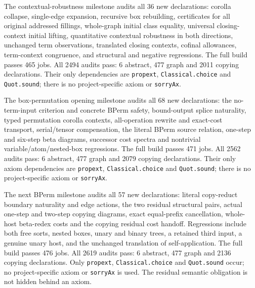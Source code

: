 The contextual-robustness milestone audits all 36 new declarations: corolla
collapse, single-edge expansion, recursive box rebuilding, certificates for
all original addressed fillings, whole-graph initial class equality, universal
closing-context initial lifting, quantitative contextual robustness in both
directions, unchanged term observations, translated closing contexts, cofinal
allowances, term-context congruence, and structural and negative regressions.
The full build passes 465 jobs. All 2494 audits pass: 6 abstract, 477 graph
and 2011 copying declarations. Their only dependencies are \texttt{propext},
\texttt{Classical.choice} and \texttt{Quot.sound}; there is no project-specific
axiom or \texttt{sorryAx}.


The box-permutation opening milestone audits all 68 new declarations: the
no-term-input criterion and concrete BPerm safety, bound-output splice
naturality, typed permutation corolla contexts, all-operation rewrite and
exact-cost transport, serial/tensor compensation, the literal BPerm source
relation, one-step and six-step beta diagrams, successor cost spectra and
nontrivial variable/atom/nested-box regressions. The full build passes 471
jobs. All 2562 audits pass: 6 abstract, 477 graph and 2079 copying declarations.
Their only axiom dependencies are \texttt{propext}, \texttt{Classical.choice}
and \texttt{Quot.sound}; there is no project-specific axiom or \texttt{sorryAx}.


The next BPerm milestone audits all 57 new declarations: literal copy-reduct
boundary naturality and edge actions, the two residual structural pairs,
actual one-step and two-step copying diagrams, exact equal-prefix cancellation,
whole-host beta-redex costs and the copying residual cost handoff. Regressions
include both free sorts, nested boxes, unary and binary trees, a retained third
input, a genuine unary host, and the unchanged translation of self-application.
The full build passes 476 jobs. All 2619 audits pass: 6 abstract, 477 graph and
2136 copying declarations. Only \texttt{propext}, \texttt{Classical.choice}
and \texttt{Quot.sound} occur; no project-specific axiom or \texttt{sorryAx}
is used. The residual semantic obligation is not hidden behind an axiom.


